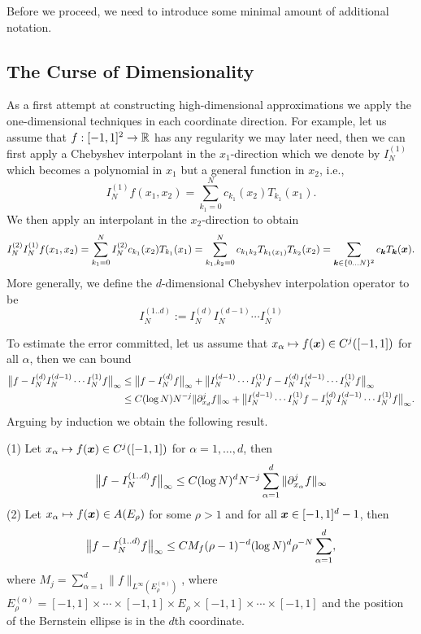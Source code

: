 Before we proceed, we need to introduce some minimal amount of additional 
notation. 


\subsection{The Curse of Dimensionality}
%
\label{sec:sparse:curse}
%
As a first attempt at constructing high-dimensional approximations we  
apply the one-dimensional techniques in each coordinate direction. For 
example, let us assume that $f : [-1,1]^2 \to \mathbb{R}$ has any regularity 
we may later need, then we can first apply a Chebyshev interpolant 
in the $x_1$-direction which we denote by $I_N^{(1)}$ 
which becomes a polynomial in $x_1$ but a general function in $x_2$, i.e., 
\[  
    I^{(1)}_N f(x_1, x_2) = 
    \sum_{k_1 = 0}^N c_{k_1}(x_2) T_{k_1}(x_1).
\]
We then apply an interpolant in the $x_2$-direction to obtain 
\[
    I^{(2)}_N I^{(1)}_N f(x_1, x_2) 
    = \sum_{k_1 = 0}^N I^{(2)}_N c_{k_1}(x_2) T_{k_1}(x_1)
    = \sum_{k_1, k_2 = 0}^N c_{k_1k_2} T_{k_1(x_1)} T_{k_2}(x_2)
    = \sum_{{\bm k} \in \{0\dots N\}^2} c_{\bm k} T_{\bm k}({\bm x}).
\]
More generally, we define the $d$-dimensional Chebyshev interpolation 
operator to be 
\[
    I^{(1..d)}_N :=  I^{(d)}_N I^{(d-1)}_N \cdots I^{(1)}_N
\]

To estimate the error committed, let us assume that $x_\alpha \mapsto f({\bm x}) \in
C^j([-1,1])$ for all $\alpha$, then we can bound 
\begin{align*}
    \big\|f -  I^{(d)}_N I^{(d-1)}_N \cdots I^{(1)}_N f\big\|_\infty 
    &\leq 
    \big\|f -  I^{(d)}_N f\big\|_\infty 
    + \big\| I^{(d-1)}_N \cdots I^{(1)}_N f - I^{(d)}_N I^{(d-1)}_N \cdots I^{(1)}_N f \big\|_\infty  \\ 
    &\leq 
    C (\log N) N^{-j} \| \partial_{x_d}^j f \|_\infty
    + \big\| I^{(d-1)}_N \cdots I^{(1)}_N f - I^{(d)}_N I^{(d-1)}_N \cdots I^{(1)}_N f \big\|_\infty.
\end{align*}
Arguing by induction we obtain the following result. 

\begin{theorem} \label{th:sparse:curse}
    (1) Let $x_\alpha \mapsto f({\bm x}) \in C^j([-1,1])$ for $\alpha = 1, \dots,
    d$, then 
    \[
        \big\|f -  I^{(1..d)}_N f\big\|_\infty 
        \leq C (\log N)^d N^{-j} \sum_{\alpha = 1}^d \| \partial_{x_\alpha}^j f \|_\infty
    \]
    (2) Let $x_\alpha \mapsto f({\bm x}) \in A(E_\rho)$ for some $\rho > 1$ and for
    all ${\bm x} \in [-1,1]^d-1$, then 
    \[
        \big\|f -  I^{(1..d)}_N f\big\|_\infty 
        \leq 
        C  M_f (\rho-1)^{-d} (\log N)^d \rho^{-N} \sum_{\alpha = 1}^d,
    \]
    where $M_j = \sum_{\alpha = 1}^d \|f\|_{L^\infty(E_\rho^{(\alpha)})}$, where
    $E_\rho^{(\alpha)} = [-1,1] \times \cdots \times [-1,1] \times E_\rho 
    \times [-1,1] \times \cdots \times [-1,1]$ and the position of the 
    Bernstein ellipse is in the $d$th coordinate. 
\end{theorem}

